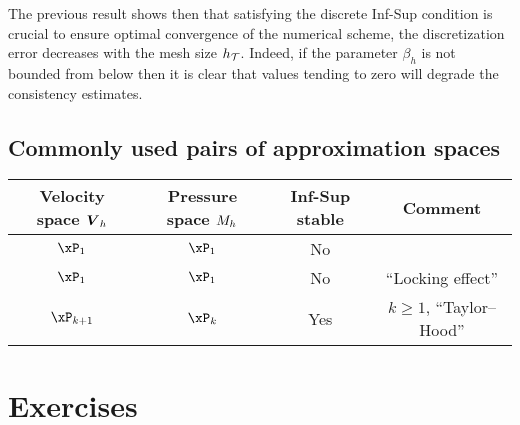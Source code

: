 \medskip
The previous result shows then that satisfying the discrete Inf-Sup condition is crucial to ensure optimal convergence of the numerical scheme, \ie the discretization error decreases with the mesh size $h_{\mathcal T}$.
Indeed, if the parameter $\beta_h$ is not bounded from below then it is clear that values tending to zero will degrade the consistency estimates.

\subsection{Commonly used pairs of approximation spaces}

\begin{center}
\begin{tabular}{cccc}
Velocity space $\boldsymbol{{V}}_h$ & Pressure space ${{M}}_h$ & Inf-Sup stable & Comment\\
\hline
\hline
$\xPone$                & $\xPone$               & No             &\\[2ex]
$\xPone$                & $\xPzero$               & No             & ``Locking effect''\\[2ex]
$\xPn{k+1}$            & $\xPn{k}$               & Yes            & $k \geq 1$, ``Taylor--Hood''\\[2ex]
\hline
\end{tabular}
\end{center}

\section{Exercises}
